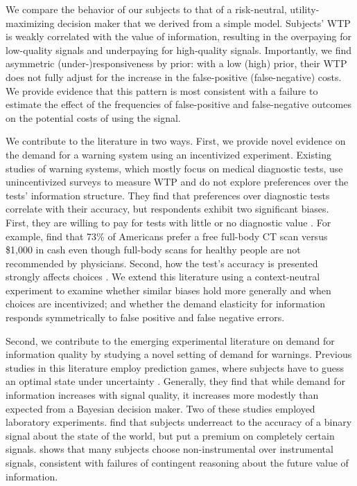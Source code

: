 \documentclass[12pt,a4paper]{article}
\begin{document}
We compare the behavior of our subjects to that of a risk-neutral, utility-maximizing decision maker that we derived from a simple model. Subjects' WTP is weakly correlated with the value of information, resulting in the overpaying for low-quality signals and underpaying for high-quality signals. Importantly, we find asymmetric (under-)responsiveness by prior: 
with a low (high) prior, their WTP does not fully adjust for the increase in the false-positive (false-negative) costs.
We provide evidence that this pattern is most consistent with a failure to estimate the effect of the frequencies of false-positive and false-negative outcomes on the potential costs of using the signal. 


We contribute to the literature in two ways. First, we provide novel evidence on the demand for a warning system using an incentivized experiment. Existing studies of warning systems, which mostly focus on medical diagnostic tests, use unincentivized surveys to measure WTP and do not explore preferences over the tests' information structure. They find that preferences over diagnostic tests correlate with their accuracy, but respondents exhibit two significant biases. First, they are willing to pay for tests with little or no diagnostic value \citep{schwartz_enthusiasm_2004, neumann_willingness--pay_2012}. For example, \citet{schwartz_enthusiasm_2004} find that 73\% of Americans prefer a free full-body CT scan versus \$1,000 in cash even though full-body scans for healthy people are not recommended by physicians. Second, how the test's accuracy is presented strongly affects choices \citep{howard_does_2009}. We extend this literature using a context-neutral experiment to examine whether similar biases hold more generally and when choices are incentivized; and whether the demand elasticity for information responds symmetrically to false positive and false negative errors. 

Second, we contribute to the emerging experimental literature on demand for information quality by studying a novel setting of demand for warnings. Previous studies in this literature employ prediction games, where subjects have to guess an optimal state under uncertainty \citep{hoffman_how_2016, ambuehl_belief_2018, xu_revealed_2022}. Generally, they find that while demand for information increases with signal quality, it increases more modestly than expected from a Bayesian decision maker. Two of these studies employed laboratory experiments. \citet{ambuehl_belief_2018} find that subjects underreact to the accuracy of a binary signal about the state of the world, but put a premium on completely certain signals. \citet{xu_revealed_2022} shows that many subjects choose non-instrumental over instrumental signals, consistent with failures of contingent reasoning about the future value of information.
\end{document}
